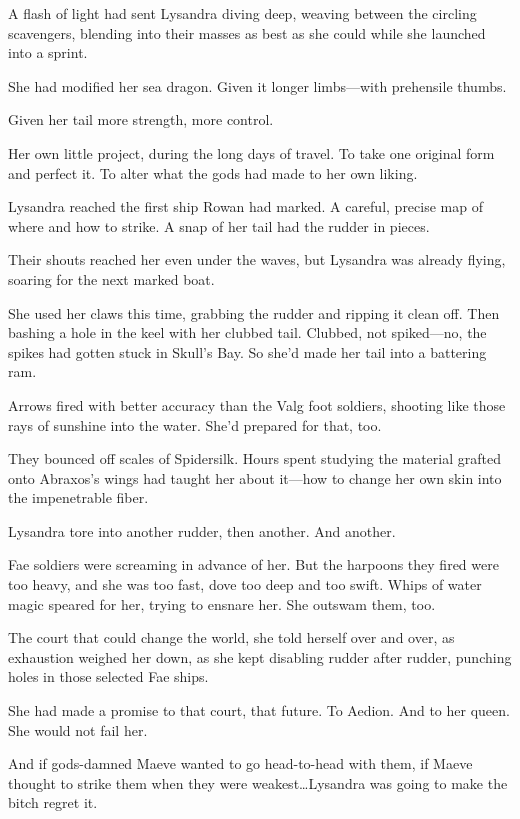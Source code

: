 A flash of light had sent Lysandra diving deep, weaving between the circling scavengers, blending into their masses as best as she could while she launched into a sprint.

She had modified her sea dragon.
Given it longer limbs---with prehensile thumbs.

Given her tail more strength, more control.

Her own little project, during the long days of travel.
To take one original form and perfect it.
To alter what the gods had made to her own liking.

Lysandra reached the first ship Rowan had marked.
A careful, precise map of where and how to strike.
A snap of her tail had the rudder in pieces.

Their shouts reached her even under the waves, but Lysandra was already flying, soaring for the next marked boat.

She used her claws this time, grabbing the rudder and ripping it clean off.
Then bashing a hole in the keel with her clubbed tail.
Clubbed, not spiked---no, the spikes had gotten stuck in Skull's Bay.
So she'd made her tail into a battering ram.

Arrows fired with better accuracy than the Valg foot soldiers, shooting like those rays of sunshine into the water.
She'd prepared for that, too.

They bounced off scales of Spidersilk.
Hours spent studying the material grafted onto Abraxos's wings had taught her about it---how to change her own skin into the impenetrable fiber.

Lysandra tore into another rudder, then another.
And another.

Fae soldiers were screaming in advance of her.
But the harpoons they fired were too heavy, and she was too fast, dove too deep and too swift.
Whips of water magic speared for her, trying to ensnare her.
She outswam them, too.

The court that could change the world, she told herself over and over, as exhaustion weighed her down, as she kept disabling rudder after rudder, punching holes in those selected Fae ships.

She had made a promise to that court, that future.
To Aedion.
And to her queen.
She would not fail her.

And if gods-damned Maeve wanted to go head-to-head with them, if Maeve thought to strike them when they were weakest\ldots Lysandra was going to make the bitch regret it.

